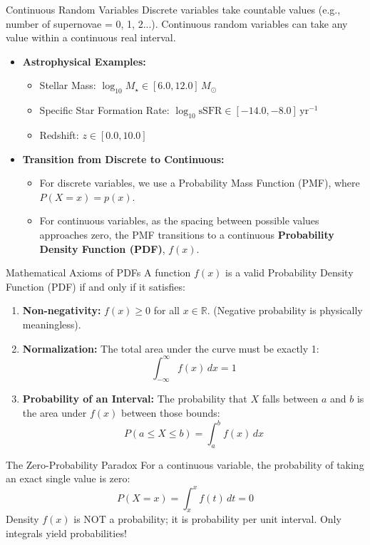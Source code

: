 \documentclass[9pt]{beamer}
\begin{document}
\begin{frame}{Continuous Random Variables}
  Discrete variables take countable values (e.g., number of supernovae = 0, 1, 2...). Continuous random variables can take any value within a continuous real interval.
  \begin{itemize}
    \item \textbf{Astrophysical Examples:}
      \begin{itemize}
        \item Stellar Mass: $\log_{10} M_\star \in [6.0, 12.0] \, M_\odot$
        \item Specific Star Formation Rate: $\log_{10} \text{sSFR} \in [-14.0, -8.0] \, \text{yr}^{-1}$
        \item Redshift: $z \in [0.0, 10.0]$
      \end{itemize}
    \item \textbf{Transition from Discrete to Continuous:}
      \begin{itemize}
        \item For discrete variables, we use a Probability Mass Function (PMF), where $P(X = x) = p(x)$.
        \item For continuous variables, as the spacing between possible values approaches zero, the PMF transitions to a continuous \textbf{Probability Density Function (PDF)}, $f(x)$.
      \end{itemize}
  \end{itemize}
\end{frame}

\begin{frame}{Mathematical Axioms of PDFs}
  A function $f(x)$ is a valid Probability Density Function (PDF) if and only if it satisfies:
  \begin{enumerate}
    \item \textbf{Non-negativity:} $f(x) \ge 0$ for all $x \in \mathbb{R}$. (Negative probability is physically meaningless).
    \item \textbf{Normalization:} The total area under the curve must be exactly 1:
      $$\int_{-\infty}^{\infty} f(x) \, dx = 1$$
    \item \textbf{Probability of an Interval:} The probability that $X$ falls between $a$ and $b$ is the area under $f(x)$ between those bounds:
      $$P(a \le X \le b) = \int_{a}^{b} f(x) \, dx$$
  \end{enumerate}
  \begin{alertblock}{The Zero-Probability Paradox}
    For a continuous variable, the probability of taking an exact single value is zero:
    $$P(X = x) = \int_x^x f(t) \, dt = 0$$
    Density $f(x)$ is NOT a probability; it is probability per unit interval. Only integrals yield probabilities!
  \end{alertblock}
\end{frame}
\end{document}
